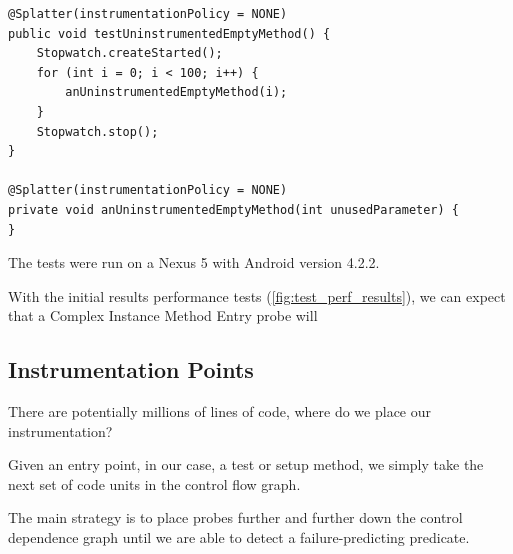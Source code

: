 {\begin{lstlisting}[caption=Uninstrumented Test,label=lst:uninstrumented_test]
@Splatter(instrumentationPolicy = NONE)
public void testUninstrumentedEmptyMethod() {
	Stopwatch.createStarted();
	for (int i = 0; i < 100; i++) {
		anUninstrumentedEmptyMethod(i);
	}
	Stopwatch.stop();
}

@Splatter(instrumentationPolicy = NONE)
private void anUninstrumentedEmptyMethod(int unusedParameter) {
}
\end{lstlisting}

The tests were run on a Nexus 5 with Android version 4.2.2.

\begin{figure}[h]
\caption{}
\label{fig:test_perf_results}

\begin{center}
\end{center}

\end{figure}

With the initial results performance tests (\autoref{fig:test_perf_results}),
we can expect that a Complex Instance Method Entry probe will 

\subsection{Instrumentation Points}
\label{sec:sec:instrumentation_points}

There are potentially millions of lines of code, where do we place our
instrumentation?

Given an entry point, in our case, a test or setup method, we simply take the
next set of code units in the control flow graph.

The main strategy is to place probes further and further down the control
dependence graph until we are able to detect a failure-predicting predicate.

}
